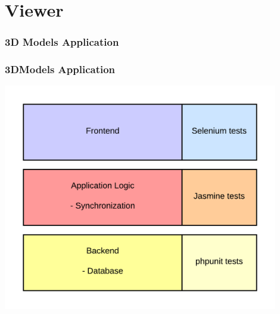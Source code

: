 \section{Viewer}

\begin{frame}
  \frametitle{3D Models Application}
\end{frame}

\begin{frame}
  \frametitle{3DModels Application}
  \begin{center}
    \includegraphics[width=0.9\textwidth]{images/LayerStructure}
  \end{center}
\end{frame}

